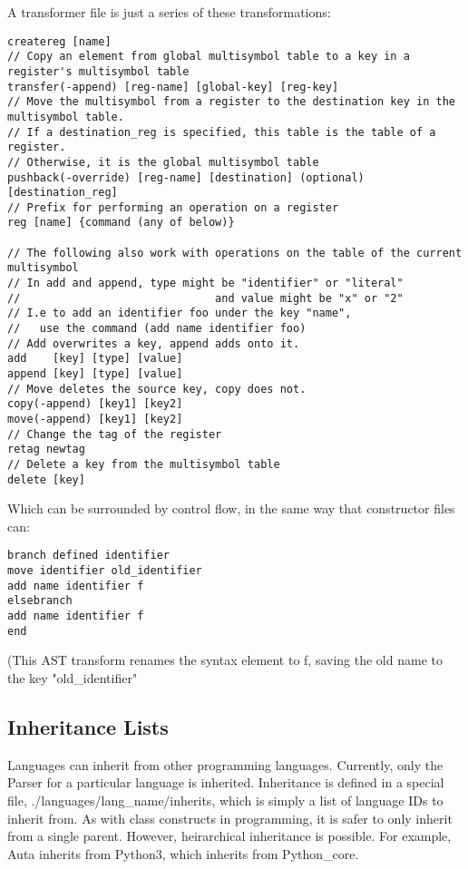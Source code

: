 \documentclass{article}
\begin{document}
A transformer file is just a series of these transformations:
\begin{verbatim}
createreg [name]
// Copy an element from global multisymbol table to a key in a register's multisymbol table
transfer(-append) [reg-name] [global-key] [reg-key] 
// Move the multisymbol from a register to the destination key in the multisymbol table. 
// If a destination_reg is specified, this table is the table of a register. 
// Otherwise, it is the global multisymbol table
pushback(-override) [reg-name] [destination] (optional)[destination_reg]
// Prefix for performing an operation on a register
reg [name] {command (any of below)} 

// The following also work with operations on the table of the current multisymbol
// In add and append, type might be "identifier" or "literal" 
//                              and value might be "x" or "2"
// I.e to add an identifier foo under the key "name", 
//   use the command (add name identifier foo)
// Add overwrites a key, append adds onto it.
add    [key] [type] [value]
append [key] [type] [value]
// Move deletes the source key, copy does not.
copy(-append) [key1] [key2]
move(-append) [key1] [key2]
// Change the tag of the register
retag newtag
// Delete a key from the multisymbol table
delete [key]
\end{verbatim}
Which can be surrounded by control flow, in the same way that constructor files can:
\begin{verbatim}
branch defined identifier 
move identifier old_identifier
add name identifier f
elsebranch
add name identifier f
end
\end{verbatim}
(This AST transform renames the syntax element to f, saving the old name to the key "old\_identifier"

\subsection{Inheritance Lists}

Languages can inherit from other programming languages.
Currently, only the Parser for a particular language is inherited.
Inheritance is defined in a special file, ./languages/lang\_name/inherits, which is simply a list of language IDs to inherit from.
As with class constructs in programming, it is safer to only inherit from a single parent.
However, heirarchical inheritance is possible.
For example, Auta inherits from Python3, which inherits from Python\_core.

\end{document}
